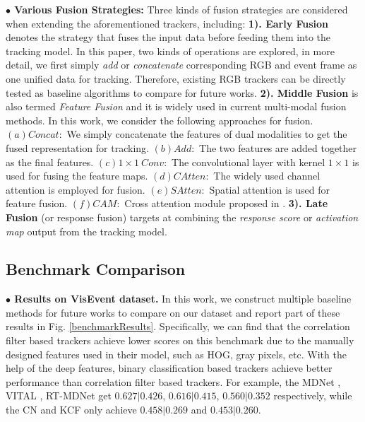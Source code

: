 \documentclass[journal]{IEEEtran}
\begin{document}
\textbf{$\bullet$ Various Fusion Strategies: }  
Three kinds of fusion strategies are considered when extending the aforementioned trackers, including: 
\textbf{1). Early Fusion} denotes the strategy that fuses the input data before feeding them into the tracking model. In this paper, two kinds of operations are explored, in more detail, we first simply \emph{add} or  \emph{concatenate} corresponding RGB and event frame as one unified data for tracking. Therefore, existing RGB trackers can be directly tested as baseline algorithms to compare for future works. 
\textbf{2). Middle Fusion} is also termed \emph{Feature Fusion} and it is widely used in current multi-modal fusion methods. In this work, we consider the following approaches for fusion. 
$(a) Concat: $ We simply concatenate the features of dual modalities to get the fused representation for tracking. 
$(b) Add: $	The two features are added together as the final features. 
$(c) 1 \times 1 ~ Conv: $ The convolutional layer with kernel $1 \times 1$  is used for fusing the feature maps. 
$(d) CAtten: $	The widely used channel attention is employed for fusion. 
$(e) SAtten: $  Spatial attention is used for feature fusion. 
$(f) CAM: $  Cross attention module proposed in \cite{suo2021CAM}. 
\textbf{3). Late Fusion}  (or response fusion) targets at combining the \emph{response score} or \emph{activation map} output from the tracking model. 



\subsection{Benchmark Comparison}  

\textbf{$\bullet$ Results on VisEvent dataset.}
In this work, we construct multiple baseline methods for future works to compare on our dataset and report part of these results in Fig. \ref{benchmarkResults}. Specifically, we can find that the correlation filter based trackers achieve lower scores on this benchmark due to the manually designed features used in their model, such as HOG, gray pixels, etc. With the help of the deep features, binary classification based trackers achieve better performance than correlation filter based trackers. For example, the MDNet \cite{Nam2015Learning}, VITAL \cite{song2018vital}, RT-MDNet \cite{Jung_2018_ECCV} get $0.627|0.426$, $0.616|0.415$, $0.560|0.352$ respectively, while the CN \cite{danelljan2014CN} and KCF \cite{Henriques2015High} only achieve $0.458|0.269$ and $0.453|0.260$. 
\end{document}
